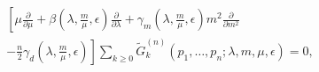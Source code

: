 \begin{equation}
\begin{split}
\left[\mu \frac{\partial}{\partial\mu}
 +\beta(\lambda,\frac{m}{\mu},\epsilon)\frac{\partial}
{\partial\lambda}+\gamma_{m}(\lambda,\frac{m}{\mu},\epsilon)
m^{2}\frac{\partial}{\partial m^{2}} \right. \\
 \left.
-\frac{n}{2}\gamma_{d}(\lambda,\frac{m}{\mu},\epsilon) \right]\sum_{k \geq 0}
\tilde{G}_{k}^{(n)}(p_{1},\dots, p_{n};\lambda ,m,
\mu,\epsilon)=0,\label{a.9}
\end{split}
\end{equation}

